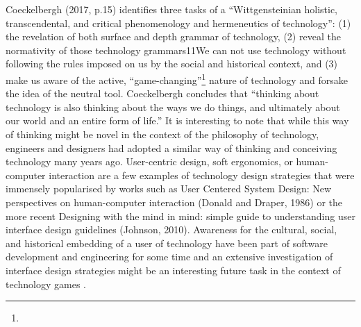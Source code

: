 Coeckelbergh (2017, p.15) identifies three tasks of a “Wittgensteinian
holistic, transcendental, and critical phenomenology and hermeneutics of
technology”: (1) the revelation of both surface and depth grammar of
technology, (2) reveal the normativity of those technology
grammars11We can not use technology without following the rules
imposed on us by the social and historical context, and (3) make us
aware of the active, “game-changing”\footnote{} nature
of technology and forsake the idea of the neutral tool. Coeckelbergh
concludes that “thinking about technology is also thinking about the
ways we do things, and ultimately about our world and an entire form of
life.” It is interesting to note that while this way of thinking might
be novel in the context of the philosophy of technology, engineers and
designers had adopted a similar way of thinking and conceiving
technology many years ago. User-centric design, soft ergonomics, or
human-computer interaction are a few examples of technology design
strategies that were immensely popularised by works such as User
Centered System Design: New perspectives on human-computer interaction
(Donald and Draper, 1986) or the more recent Designing with the
mind in mind: simple guide to understanding user interface design
guidelines (Johnson, 2010). Awareness for the cultural, social, and
historical embedding of a user of technology have been part of software
development and engineering for some time and an extensive investigation
of interface design strategies might be an interesting future task in
the context of technology games .
